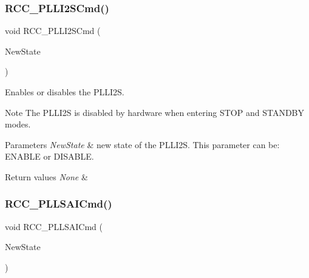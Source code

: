 \subsubsection{\texorpdfstring{R\+C\+C\+\_\+\+P\+L\+L\+I2\+S\+Cmd()}{RCC\_PLLI2SCmd()}}
{\footnotesize\ttfamily void R\+C\+C\+\_\+\+P\+L\+L\+I2\+S\+Cmd (\begin{DoxyParamCaption}\item[{Functional\+State}]{New\+State }\end{DoxyParamCaption})}



Enables or disables the P\+L\+L\+I2S. 

\begin{DoxyNote}{Note}
The P\+L\+L\+I2S is disabled by hardware when entering S\+T\+OP and S\+T\+A\+N\+D\+BY modes. ~\newline

\end{DoxyNote}

\begin{DoxyParams}{Parameters}
{\em New\+State} & new state of the P\+L\+L\+I2S. This parameter can be\+: E\+N\+A\+B\+LE or D\+I\+S\+A\+B\+LE. \\
\hline
\end{DoxyParams}

\begin{DoxyRetVals}{Return values}
{\em None} & \\
\hline
\end{DoxyRetVals}
\mbox{\label{group___r_c_c___group1_gaf7b2c8f7533c8321dce97196d9f77fc1}} 
\subsubsection{\texorpdfstring{R\+C\+C\+\_\+\+P\+L\+L\+S\+A\+I\+Cmd()}{RCC\_PLLSAICmd()}}
{\footnotesize\ttfamily void R\+C\+C\+\_\+\+P\+L\+L\+S\+A\+I\+Cmd (\begin{DoxyParamCaption}\item[{Functional\+State}]{New\+State }\end{DoxyParamCaption})}



